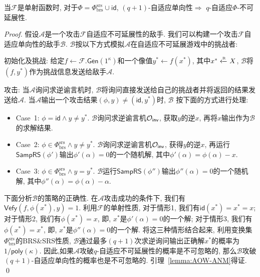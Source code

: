 \begin{lemma}\label{lemma:AOW-ANM}
当$\mathcal{F}$是单射函数时, 对于$\Phi = \Phi_\text{brs}^\text{srs} \cup \mathsf{id}$, $(q+1)$-自适应单向性$\Rightarrow$ $q$-自适应$\Phi$-不可延展性.  
\end{lemma}
\begin{proof}
假设$\mathcal{A}$是一个攻击$\mathcal{F}$自适应不可延展性的敌手. 我们可以构建一个攻击$\mathcal{F}$自适应单向性的敌手$\mathcal{B}$. $\mathcal{B}$按以下方式模拟$\mathcal{A}$在自适应不可延展游戏中的挑战者: 
\begin{trivlist}
\item 初始化及挑战: 给定$f \leftarrow \mathcal{F}.\mathsf{Gen}(1^\kappa)$和一个像值$y^* \leftarrow f(x^*)$, 其中$x^* \xleftarrow{\textup{\tiny R}} X$, $\mathcal{B}$将$(f, y^*)$作为挑战信息发送给敌手$\mathcal{A}$. 

\item 攻击: 当$\mathcal{A}$询问求逆谕言机时, $\mathcal{B}$将询问直接发送给自己的挑战者并将返回的结果发送给$\mathcal{A}$. 当$\mathcal{A}$输出一个攻击结果$(\phi, y) \neq (\mathsf{id}, y^*)$时, $\mathcal{B}$ 按下面的方式进行处理: 
	\begin{itemize}
	\item Case~1: $\phi = \mathsf{id} \wedge y \neq y^*$. $\mathcal{B}$询问求逆谕言机$\mathcal{O}_\mathsf{inv}$, 获取$y$的逆$x$, 再将$x$输出作为$\mathcal{B}$的求解结果. 

	\item Case~2: $\phi \in \Phi_\text{brs}^\text{srs} \wedge y \neq y^*$. $\mathcal{B}$询问求逆谕言机$\mathcal{O}_\mathsf{inv}$, 获得$y$的逆$x$, 再运行$\mathsf{SampRS}(\phi')$输出$\phi'(\alpha) = 0$的一个随机解, 其中$\phi'(\alpha) = \phi(\alpha) - x$. 

	\item Case~3: $\phi \in \Phi_\text{brs}^\text{srs} \wedge y = y^*$. $\mathcal{B}$运行$\mathsf{SampRS}(\phi'')$输出$\phi''(\alpha) = 0$的一个随机解, 其中$\phi''(\alpha) = \phi(\alpha) - \alpha$.  
	\end{itemize}
\end{trivlist}
下面分析$\mathcal{B}$的策略的正确性. 在$\mathcal{A}$攻击成功的条件下, 我们有$\mathsf{Vefy}(f, \phi(x^*), y) = 1$. 利用$\mathcal{F}$的单射性质, 对于情形1, 我们有$\mathsf{id}(x^*) = x^* = x$;   
对于情形2, 我们有$\phi(x^*) = x$, 即, $x^*$是$\phi'(\alpha) = 0$的一个解; 对于情形3, 我们有$\phi(x^*) = x^*$, 即, $x^*$是$\phi''(\alpha) = 0$的一个解. 将这三种情形结合起来, 利用变换集$\Phi_\text{brs}^\text{srs}$的BRS\&SRS性质, $\mathcal{B}$通过最多$(q+1)$次求逆询问输出正确解$x^*$的概率为$1/\mathsf{poly}(\kappa)$. 因此,如果$\mathcal{A}$攻破$q$-自适应不可延展性的概率是不可忽略的, 那么$\mathcal{B}$攻破$(q+1)$-自适应单向性的概率也是不可忽略的. 引理~\ref{lemma:AOW-ANM}得证. \qed 
\end{proof}

